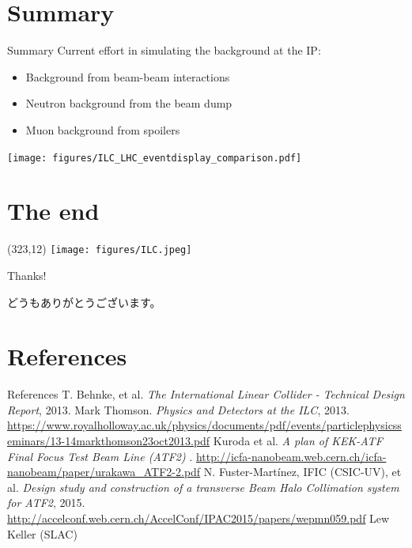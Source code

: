 \documentclass[xcolor={dvipsnames}]{beamer}
\newcommand{\ilclogo}{
  \setlength{\TPHorizModule}{1pt}
  \setlength{\TPVertModule}{1pt}
  \begin{textblock}{1}(323,12)
   \texttt{[image: figures/ILC.jpeg]}
  \end{textblock}
}
\begin{document}
\section*{Summary}
\begin{frame}{Summary}
Current effort in simulating the background at the IP:
 \begin{itemize}
  \item Background from beam-beam interactions
  \item Neutron background from the beam dump
  \item Muon background from spoilers
 \end{itemize}
 
 \vspace*{0.5cm}
 
 \begin{center}
  \texttt{[image: figures/ILC\_LHC\_eventdisplay\_comparison.pdf]}
 \end{center}


\end{frame}




\section*{The end}
{
\begin{frame}
\ilclogo
\begin{center}
\textcolor{RubineRed}{
	\LARGE Thanks!\\
	\vspace*{0.5cm}
	\begin{CJK}{UTF8}{min}
	どうもありがとうございます。
	\end{CJK}
}
\end{center}
\end{frame}
}

\section*{References}
\begin{thebibliography}{9}
\begin{frame}{References}
 T. Behnke, et al. \emph{The International Linear Collider - Technical Design Report}, 2013.
 Mark Thomson. \emph{Physics and Detectors at the ILC}, 2013. \url{https://www.royalholloway.ac.uk/physics/documents/pdf/events/particlephysicsseminars/13-14markthomson23oct2013.pdf}
 Kuroda et al. \emph{A plan of KEK-ATF Final Focus Test Beam Line (ATF2)
}. \url{http://icfa-nanobeam.web.cern.ch/icfa-nanobeam/paper/urakawa_ATF2-2.pdf}
 N. Fuster-Martínez, IFIC (CSIC-UV), et al. \emph{Design study and construction of a transverse Beam Halo Collimation system for ATF2}, 2015. \url{http://accelconf.web.cern.ch/AccelConf/IPAC2015/papers/wepmn059.pdf}
 Lew Keller (SLAC)

\end{frame}
\end{thebibliography}
\end{document}
